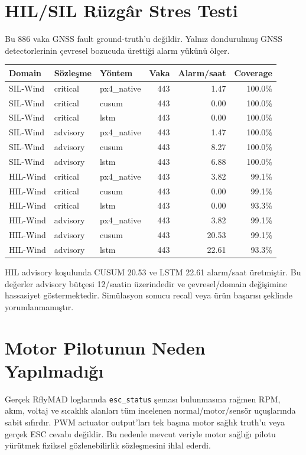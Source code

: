 \documentclass[11pt,a4paper]{article}
\begin{document}
\section{HIL/SIL Rüzgâr Stres Testi}
Bu 886 vaka GNSS fault ground-truth'u değildir. Yalnız dondurulmuş GNSS
detectorlerinin çevresel bozucuda ürettiği alarm yükünü ölçer.
\begin{longtable}{lllrrr}
\toprule Domain & Sözleşme & Yöntem & Vaka & Alarm/saat & Coverage \\ \midrule
\endhead
SIL-Wind & critical & px4\_native & 443 & 1.47 & 100.0\% \\
SIL-Wind & critical & cusum & 443 & 0.00 & 100.0\% \\
SIL-Wind & critical & lstm & 443 & 0.00 & 100.0\% \\
SIL-Wind & advisory & px4\_native & 443 & 1.47 & 100.0\% \\
SIL-Wind & advisory & cusum & 443 & 8.27 & 100.0\% \\
SIL-Wind & advisory & lstm & 443 & 6.88 & 100.0\% \\
HIL-Wind & critical & px4\_native & 443 & 3.82 & 99.1\% \\
HIL-Wind & critical & cusum & 443 & 0.00 & 99.1\% \\
HIL-Wind & critical & lstm & 443 & 0.00 & 93.3\% \\
HIL-Wind & advisory & px4\_native & 443 & 3.82 & 99.1\% \\
HIL-Wind & advisory & cusum & 443 & 20.53 & 99.1\% \\
HIL-Wind & advisory & lstm & 443 & 22.61 & 93.3\% \\
\bottomrule
\end{longtable}

HIL advisory koşulunda CUSUM 20.53 ve LSTM 22.61 alarm/saat üretmiştir.
Bu değerler advisory bütçesi 12/saatin üzerindedir ve çevresel/domain
değişimine hassasiyet göstermektedir. Simülasyon sonucu recall veya ürün
başarısı şeklinde yorumlanmamıştır.

\section{Motor Pilotunun Neden Yapılmadığı}
Gerçek RflyMAD loglarında \texttt{esc\_status} şeması bulunmasına rağmen RPM,
akım, voltaj ve sıcaklık alanları tüm incelenen normal/motor/sensör
uçuşlarında sabit sıfırdır. PWM actuator output'ları tek başına motor sağlık
truth'u veya gerçek ESC cevabı değildir. Bu nedenle mevcut veriyle motor
sağlığı pilotu yürütmek fiziksel gözlenebilirlik sözleşmesini ihlal ederdi.
\end{document}
